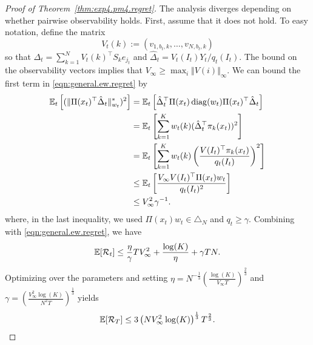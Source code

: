 \documentclass{article}
\newcommand{\regret}{\mathcal{R}}
\begin{document}
\begin{proof}[Proof of Theorem~\ref{thm:exp4.pm4.regret}]
The analysis diverges depending on whether pairwise observability holds. First, assume that it does not hold. To easy notation, define the matrix
\[
  V_t(k) := \left( v_{1,b_t,k}, \ldots,v_{N,b_t,k}\right)
\]
so that $\Delta_t = \sum_{k=1}^N V_t(k)^\top S_k e_{j_t}$ and $\hat\Delta_t = V_t(I_t)Y_t/q_t(I_t)$. The bound on the observability vectors implies that $V_\infty \geq \max_i\Vert V(i)\Vert_\infty$. We can bound the first term in \eqref{eqn:general.ew.regret} by
\begin{align*}
    \mathbb E_t\left[(\Vert \Pi(x_t)^\top\hat\Delta_t\Vert_{w_t}^*)^2\right]
  &=
    \mathbb E_t\left[\hat\Delta_t^\top\Pi(x_t) \operatorname*{diag}(w_t)\Pi(x_t)^\top \hat\Delta_t \right]\\
  &=
    \mathbb E_t\left[\sum_{k=1}^K w_t(k)(\hat\Delta_t^\top\pi_k(x_t))^2 \right]\\
  &=
    \mathbb E_t\left[\sum_{k=1}^K w_t(k)\left(\frac{V(I_t)^\top\pi_k(x_t)}{q_t(I_t)}\right)^2\right]\\
    &\leq
      \mathbb E_t\left[\frac{V_\infty V(I_t)^\top \Pi(x_t)w_t}{q_t(I_t)^2}\right]\\
  &\leq
    V_\infty^2 \gamma^{-1}.
\end{align*}
where, in the last inequality, we used $\Pi(x_t)w_t \in \triangle_N$ and $q_t \geq \gamma$. Combining with \eqref{eqn:general.ew.regret}, we have 
\begin{equation*}
  \ex[\regret_t] \leq
  \frac{\eta}{\gamma} T V_\infty^2  + \frac{\log (K)}{\eta} + \gamma T N.
\end{equation*}
Optimizing over the parameters and setting
$\eta = N^{-\frac13} \left(\frac{\log(K)}{V_\infty T}\right)^{\frac23}$ and
$\gamma = \left( \frac{ V_\infty^2 \log(K)}{N^2 T}\right)^{\frac13}$ yields
\[
  \mathbb E[\mathcal R_T] \leq 3 \left(N V_\infty^2 \log(K)\right)^{\frac13} T^{\frac23}.
\]


\end{proof}
\end{document}
